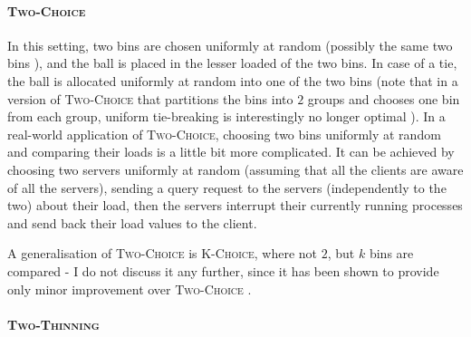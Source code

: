 \paragraph{\textsc{Two-Choice}}
In this setting, two bins are chosen uniformly at random (possibly the same two bins ), and the ball is placed in the lesser loaded of the two bins. In case of a tie, the ball is allocated uniformly at random into one of the two bins  (note that in a version of \textsc{Two-Choice} that partitions the bins into $2$ groups and chooses one bin from each group, uniform tie-breaking is interestingly no longer optimal \cite{vocking2003tiebreaking}). In a real-world application of \textsc{Two-Choice}, choosing two bins uniformly at random and comparing their loads is a little bit more complicated. It can be achieved by choosing two servers uniformly at random (assuming that all the clients are aware of all the servers), sending a query request to the servers (independently to the two) about their load, then the servers interrupt their currently running processes and send back their load values to the client.

A generalisation of \textsc{Two-Choice} is \textsc{K-Choice}, where not $2$, but $k$ bins are compared - I do not discuss it any further, since it has been shown to provide only minor improvement  over \textsc{Two-Choice} \cite{azar1999twochoice}.


\paragraph{\textsc{Two-Thinning}}


